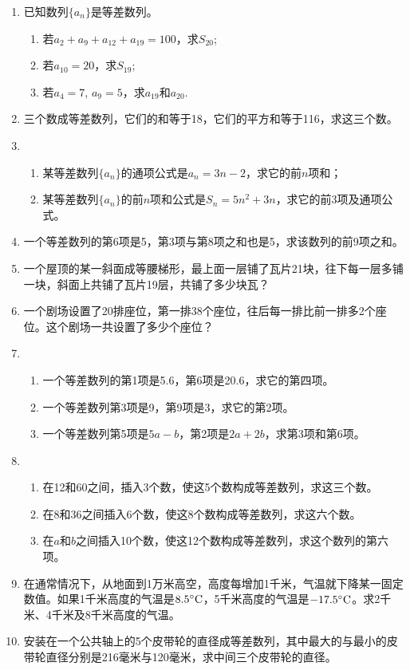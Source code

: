 \begin{enumerate}
    \item 已知数列$\{a_n\}$是等差数列。
\begin{enumerate}[(1)]
\item 若$a_2+a_9+a_{12}+a_{19}=100$，求$S_{20}$;
\item 若$a_{10}=20$，求$S_{19}$;
\item 若$a_4=7$, $a_9=5$，求$a_{19}$和$a_{20}$.
\end{enumerate}

    \item 三个数成等差数列，它们的和等于18，它们的平方和等于116，求这三个数。
    \item  \begin{enumerate}[(1)]
        \item 某等差数列$\{a_n\}$的通项公式是$a_n=3n-2$，求它的前$n$项和；
    \item 某等差数列$\{a_n\}$的前$n$项和公式是$S_n=5n^2+3n$，求它的前3项及通项公式。
    \end{enumerate}   
    \item     一个等差数列的第6项是5，第3项与第8项之和也是5，求该数列的前9项之和。
    \item     一个屋顶的某一斜面成等腰梯形，最上面一层铺了瓦片21块，往下每一层多铺一块，斜面上共铺了瓦片19层，共铺了多少块瓦？
    \item     一个剧场设置了20排座位，第一排38个座位，往后每一排比前一排多2个座位。这个剧场一共设置了多少个座位？
\item \begin{enumerate}[(1)]
    \item 一个等差数列的第1项是5.6，第6项是20.6，求它的第四项。
    \item  一个等差数列第3项是9，第9项是3，求它的第2项。
    \item 一个等差数列第5项是$5a-b$，第2项是$2a+2b$，求第3项和第6项。
    \end{enumerate}
\item \begin{enumerate}[(1)]
\item 在12和60之间，插入3个数，使这5个数构成等差数列，求这三个数。
\item 在8和36之间插入6个数，使这8个数构成等差数列，求这六个数。
\item 在$a$和$b$之间插入10个数，使这12个数构成等差数列，求这个数列的第六项。
\end{enumerate}
\item 在通常情况下，从地面到1万米高空，高度每增加1千米，气温就下降某一固定数值。如果1千米高度的气温是$8.5^{\circ}{\rm C}$，5千米高度的气温是$-17.5^{\circ}{\rm C}$。求2千米、4千米及8千米高度的气温。
\item 安装在一个公共轴上的5个皮带轮的直径成等差数列，其中最大的与最小的皮带轮直径分别是216毫米与120毫米，求中间三个皮带轮的直径。

\end{enumerate}





